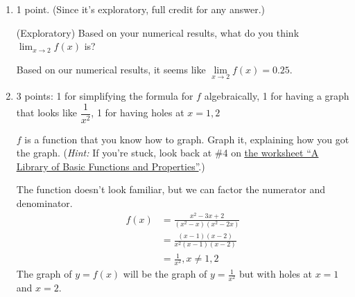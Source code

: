 \documentclass{article}
\makeatletter
\let\@href=\href
\renewcommand{\href}[2]{\@href{#1}{\ul{#2}}}
\makeatother
\begin{document}
\begin{enumerate}
\begin{enumerate}
    \pspace{0.25in}

  \item \label{limit-intro-numerical-guess}

    \begin{grading}
      1 point. (Since it's exploratory, full credit for any answer.) 
    \end{grading}

    \begin{problem}[\vfill\newpage]
      (Exploratory) Based on your numerical results, what do you think $\displaystyle \lim_{x \to 2} f(x)$ is? 
    \end{problem}

    \begin{solution}
      Based on our numerical results, it seems like $\lim\limits_{x \to 2} f(x) = 0.25$. 
    \end{solution}

  \item

    \begin{grading}
      3 points: 1 for simplifying the formula for $f$ algebraically, 1 for having a graph that looks like $\dfrac{1}{x^2}$, 1 for having holes at $x = 1, 2$
    \end{grading}

    \begin{problem}[\vfill]
      $f$ is a function that you know how to graph. Graph it, explaining how you got the graph. (\emph{Hint:} If you're stuck, look back at {{\#4}} on \href{https://people.math.harvard.edu/~jjchen/mathma/docs/worksheets/worksheet02-sols.html}{the worksheet ``A Library of Basic Functions and Properties''}.) 
    \end{problem}

    \begin{solution}
      The function doesn't look familiar, but we can factor the numerator and denominator.
      \begin{align*}
        f(x) &= \frac{x^2 - 3x + 2}{(x^2-x)(x^2-2x)} \\
        &= \frac{(x-1)(x-2)}{x^2(x-1)(x-2)} \\
        &= \frac{1}{x^2}, x \neq 1, 2
      \end{align*}
      The graph of $y=f(x)$ will be the graph of $y=\frac{1}{x^2}$ but with holes at $x=1$ and $x=2$.

    \end{solution}


\end{enumerate}
\end{enumerate}
\end{document}
